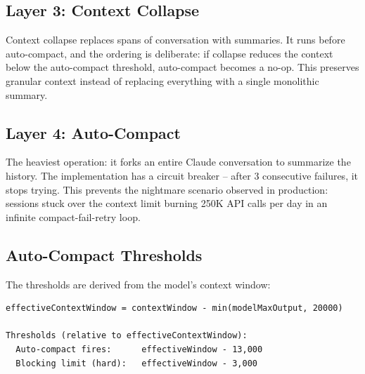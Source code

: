 \documentclass[
  english,
  11pt,
  letterpaper,
]{book}
\begin{document}
\subsection{Layer 3: Context Collapse}\label{layer-3-context-collapse}

Context collapse replaces spans of conversation with summaries. It runs
before auto-compact, and the ordering is deliberate: if collapse reduces
the context below the auto-compact threshold, auto-compact becomes a
no-op. This preserves granular context instead of replacing everything
with a single monolithic summary.

\subsection{Layer 4: Auto-Compact}\label{layer-4-auto-compact}

The heaviest operation: it forks an entire Claude conversation to
summarize the history. The implementation has a circuit breaker -- after
3 consecutive failures, it stops trying. This prevents the nightmare
scenario observed in production: sessions stuck over the context limit
burning 250K API calls per day in an infinite compact-fail-retry loop.

\subsection{Auto-Compact Thresholds}\label{auto-compact-thresholds}

The thresholds are derived from the model's context window:

\begin{verbatim}
effectiveContextWindow = contextWindow - min(modelMaxOutput, 20000)

Thresholds (relative to effectiveContextWindow):
  Auto-compact fires:      effectiveWindow - 13,000
  Blocking limit (hard):   effectiveWindow - 3,000
\end{verbatim}
\end{document}
